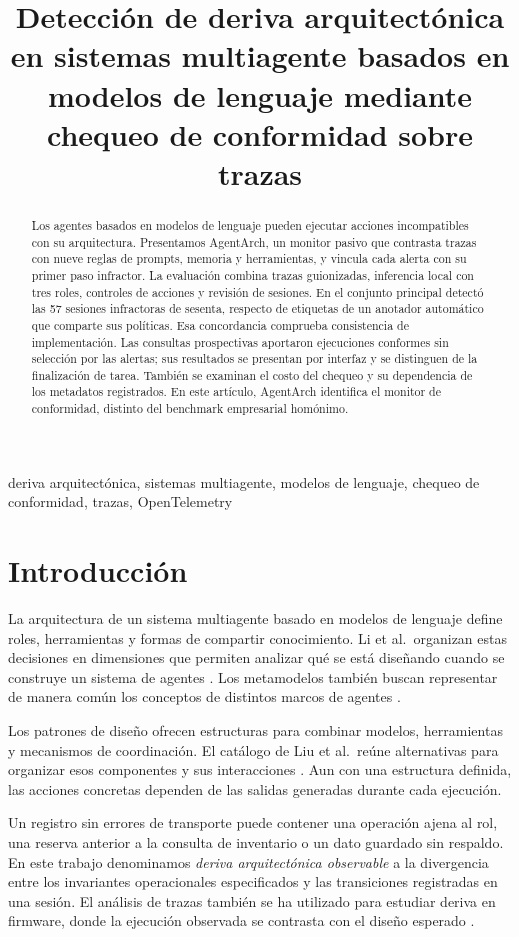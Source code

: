 \documentclass[conference]{IEEEtran}
\title{Detección de deriva arquitectónica en sistemas multiagente basados en modelos de lenguaje mediante chequeo de conformidad sobre trazas}
\author{\IEEEauthorblockN{Leonardo Baca Calsin y German Arturo Chipana Jeronimo}
\IEEEauthorblockA{Departamento de Ingeniería de Sistemas e Informática\\
Universidad Nacional de San Agustín de Arequipa, Arequipa, Perú\\
lbacac@unsa.edu.pe, gchipanaj@unsa.edu.pe}}
\begin{document}
\maketitle
\begin{abstract}
Los agentes basados en modelos de lenguaje pueden ejecutar acciones incompatibles con su arquitectura. Presentamos AgentArch, un monitor pasivo que contrasta trazas con nueve reglas de prompts, memoria y herramientas, y vincula cada alerta con su primer paso infractor. La evaluación combina trazas guionizadas, inferencia local con tres roles, controles de acciones y revisión de sesiones. En el conjunto principal detectó las 57 sesiones infractoras de sesenta, respecto de etiquetas de un anotador automático que comparte sus políticas. Esa concordancia comprueba consistencia de implementación. Las consultas prospectivas aportaron ejecuciones conformes sin selección por las alertas; sus resultados se presentan por interfaz y se distinguen de la finalización de tarea. También se examinan el costo del chequeo y su dependencia de los metadatos registrados. En este artículo, AgentArch identifica el monitor de conformidad, distinto del benchmark empresarial homónimo.
\end{abstract}
\begin{IEEEkeywords}
deriva arquitectónica, sistemas multiagente, modelos de lenguaje, chequeo de conformidad, trazas, OpenTelemetry
\end{IEEEkeywords}

\section{Introducción}
La arquitectura de un sistema multiagente basado en modelos de lenguaje define roles, herramientas y formas de compartir conocimiento. Li et al.\ organizan estas decisiones en dimensiones que permiten analizar qué se está diseñando cuando se construye un sistema de agentes \cite{li}. Los metamodelos también buscan representar de manera común los conceptos de distintos marcos de agentes \cite{miranda}.

Los patrones de diseño ofrecen estructuras para combinar modelos, herramientas y mecanismos de coordinación. El catálogo de Liu et al.\ reúne alternativas para organizar esos componentes y sus interacciones \cite{liu}. Aun con una estructura definida, las acciones concretas dependen de las salidas generadas durante cada ejecución.

Un registro sin errores de transporte puede contener una operación ajena al rol, una reserva anterior a la consulta de inventario o un dato guardado sin respaldo. En este trabajo denominamos \emph{deriva arquitectónica observable} a la divergencia entre los invariantes operacionales especificados y las transiciones registradas en una sesión. El análisis de trazas también se ha utilizado para estudiar deriva en firmware, donde la ejecución observada se contrasta con el diseño esperado \cite{deangelis}.
\end{document}
